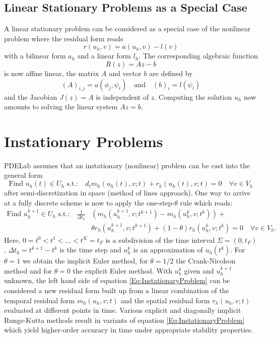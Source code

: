 \documentclass[a4paper,12pt]{article}
\theoremstyle{definition}
\begin{document}
\subsection*{Linear Stationary Problems as a Special Case}

A linear stationary problem can be considered as a special case
of the nonlinear problem where the residual form reads
\begin{equation}
r(u_h,v) = a(u_h,v) -l(v)
\end{equation}
with a bilinear form $a_h$ and a linear form $l_h$.
The corresponding algebraic function
\begin{equation*}
R(z) = Az-b
\end{equation*}
is now affine linear, the matrix $A$ and vector $b$ are defined by
\begin{equation*}
(A)_{i,j} = a(\phi_j,\psi_i) \quad\text{and}\quad (b)_i = l(\psi_i)
\end{equation*}
and the Jacobian $J(z)=A$ is independent of $z$. Computing the solution
$u_h$ now amounts to solving the linear system $Az=b$.

\section{Instationary Problems}

PDELab assumes that an instationary (nonlinear) problem can be cast into the
general form
\begin{equation}
\text{Find $u_h(t)\in U_h$ s.t.:}
\quad d_t m_h(u_h(t),v;t) + r_h(u_h(t),v;t) = 0
\quad \forall v\in V_h
\label{Eq:Instationary}
\end{equation}
after semi-discretization in space (method of lines approach).
One way to arrive at a fully discrete scheme is now to
apply the one-step-$\theta$ rule which reads:
\begin{equation}
\label{Eq:InstationaryProblem}
\begin{split}
\text{Find $u_h^{k+1}\in U_h$ s.t.:}
\quad \frac{1}{\Delta t_k}&(m_h(u_h^{k+1},v;t^{k+1})-m_h(u_h^{k},v;t^k)) + \\
&\theta r_h(u_h^{k+1},v;t^{k+1}) + (1-\theta) r_h(u_h^{k},v;t^k) = 0
\quad \forall v\in V_h.
\end{split}
\end{equation}
Here, $0=t^0 < t^1 < \ldots < t^K=t_F$ is a subdivision of the
time interval $\Sigma=(0,t_F)$, $\Delta t_k = t^{k+1}-t^k$ is the time step
and $u_h^{k}$ is an approximation of $u_h(t^k)$. For $\theta=1$
we obtain the implicit Euler method, for $\theta=1/2$ the Crank-Nicolson method
and for $\theta=0$ the explicit Euler method. With $u_h^k$ given
and $u_h^{k+1}$ unknown, the left hand side of equation \eqref{Eq:InstationaryProblem}
can be considered a new residual form built up from a linear combination of the
temporal residual form $m_h(u_h,v;t)$ and the spatial residual form $r_h(u_h,v;t)$
evaluated at different points in time.
Various explicit and diagonally implicit Runge-Kutta \cite{alexander:77}
methods result in variants of
equation \eqref{Eq:InstationaryProblem} which yield higher-order accuracy in
time under appropriate stability properties.
\end{document}
